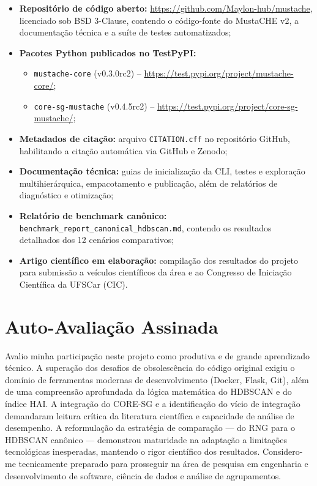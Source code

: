 \documentclass[12pt,a4paper,oneside]{article}
\begin{document}
\begin{itemize}
  \item \textbf{Repositório de código aberto:} \url{https://github.com/Maylon-hub/mustache},
        licenciado sob BSD 3-Clause, contendo o código-fonte do MustaCHE v2, a documentação
        técnica e a suíte de testes automatizados;
  \item \textbf{Pacotes Python publicados no TestPyPI:}
        \begin{itemize}
          \item \texttt{mustache-core} (v0.3.0rc2) -- \url{https://test.pypi.org/project/mustache-core/};
          \item \texttt{core-sg-mustache} (v0.4.5rc2) -- \url{https://test.pypi.org/project/core-sg-mustache/};
        \end{itemize}
  \item \textbf{Metadados de citação:} arquivo \texttt{CITATION.cff} no repositório GitHub,
        habilitando a citação automática via GitHub e Zenodo;
  \item \textbf{Documentação técnica:} guias de inicialização da CLI, testes e exploração
        multihierárquica, empacotamento e publicação, além de relatórios de diagnóstico e
        otimização;
  \item \textbf{Relatório de benchmark canônico:} \texttt{benchmark\_report\_canonical\_hdbscan.md},
        contendo os resultados detalhados dos 12 cenários comparativos;
  \item \textbf{Artigo científico em elaboração:} compilação dos resultados do projeto para
        submissão a veículos científicos da área e ao Congresso de Iniciação Científica da
        UFSCar (CIC).
\end{itemize}

\section{Auto-Avaliação Assinada}

Avalio minha participação neste projeto como produtiva e de grande aprendizado técnico. A
superação dos desafios de obsolescência do código original exigiu o domínio de ferramentas
modernas de desenvolvimento (Docker, Flask, Git), além de uma compreensão aprofundada da lógica
matemática do HDBSCAN e do índice HAI. A integração do CORE-SG e a identificação do vício de
integração demandaram leitura crítica da literatura científica e capacidade de análise de
desempenho. A reformulação da estratégia de comparação --- do RNG para o HDBSCAN canônico ---
demonstrou maturidade na adaptação a limitações tecnológicas inesperadas, mantendo o rigor
científico dos resultados. Considero-me tecnicamente preparado para prosseguir na área de
pesquisa em engenharia e desenvolvimento de software, ciência de dados e análise de agrupamentos.
\end{document}
